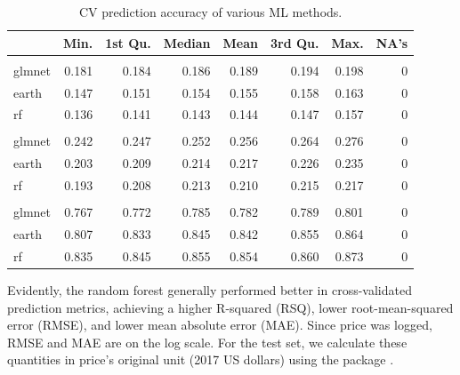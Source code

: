 \begin{Schunk}
\begin{table}

\caption{\label{tab:unnamed-chunk-14}CV prediction accuracy of various ML methods.}
\centering
\begin{tabular}[t]{lrrrrrrr}
\toprule
  & Min. & 1st Qu. & Median & Mean & 3rd Qu. & Max. & NA's\\
\midrule
\addlinespace[0.3em]
\multicolumn{8}{l}{\textbf{MAE}}\\
\hspace{1em}glmnet & 0.181 & 0.184 & 0.186 & 0.189 & 0.194 & 0.198 & 0\\
\hspace{1em}earth & 0.147 & 0.151 & 0.154 & 0.155 & 0.158 & 0.163 & 0\\
\hspace{1em}rf & 0.136 & 0.141 & 0.143 & 0.144 & 0.147 & 0.157 & 0\\
\addlinespace[0.3em]
\multicolumn{8}{l}{\textbf{RMSE}}\\
\hspace{1em}glmnet & 0.242 & 0.247 & 0.252 & 0.256 & 0.264 & 0.276 & 0\\
\hspace{1em}earth & 0.203 & 0.209 & 0.214 & 0.217 & 0.226 & 0.235 & 0\\
\hspace{1em}rf & 0.193 & 0.208 & 0.213 & 0.210 & 0.215 & 0.217 & 0\\
\addlinespace[0.3em]
\multicolumn{8}{l}{\textbf{RSQ}}\\
\hspace{1em}glmnet & 0.767 & 0.772 & 0.785 & 0.782 & 0.789 & 0.801 & 0\\
\hspace{1em}earth & 0.807 & 0.833 & 0.845 & 0.842 & 0.855 & 0.864 & 0\\
\hspace{1em}rf & 0.835 & 0.845 & 0.855 & 0.854 & 0.860 & 0.873 & 0\\
\bottomrule
\end{tabular}
\end{table}

\end{Schunk}

Evidently, the random forest generally performed better in
cross-validated prediction metrics, achieving a higher R-squared (RSQ),
lower root-mean-squared error (RMSE), and lower mean absolute error
(MAE). Since price was logged, RMSE and MAE are on the log scale. For
the test set, we calculate these quantities in price's original unit
(2017 US dollars) using the  package
\citep{yardstick}.

